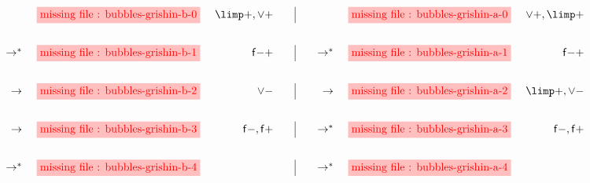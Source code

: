 \setlength{\fboxsep}{2pt}
\setlength{\arraycolsep}{0pt}
\newcommand{\vsp}{\vspace{2em}}
$$
\begin{array}[t]{rcr@{\qquad}|@{\qquad}rcr@{\vsp}}
       &\stkfig{1}{bubbles-grishin-b-0} &{\limp}{+}, {\lor}{+} &
       &\stkfig{1}{bubbles-grishin-a-0} &{\lor}{+}, {\limp}{+} \\

\steps &\stkfig{1}{bubbles-grishin-b-1} &{\mathsf{f{-}{+}}} &
\steps &\stkfig{1}{bubbles-grishin-a-1} &{\mathsf{f{-}{+}}} \\

\step  &\stkfig{1}{bubbles-grishin-b-2} &{\lor}{-} &
\step  &\stkfig{1}{bubbles-grishin-a-2} &{\limp}{+}, {\lor}{-} \\

\step  &\stkfig{1}{bubbles-grishin-b-3} &\mathsf{f{-}}, \mathsf{f{+}} &
\steps &\stkfig{1}{bubbles-grishin-a-3} &\mathsf{f{-}}, \mathsf{f{+}} \\

\steps &\stkfig{1}{bubbles-grishin-b-4} & &
\steps &\stkfig{1}{bubbles-grishin-a-4} &
\end{array}
$$

